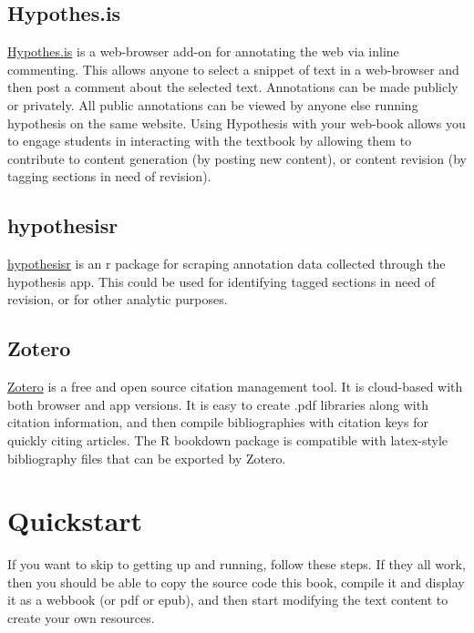 \documentclass[]{book}
\theoremstyle{definition}
\theoremstyle{definition}
\theoremstyle{definition}
\theoremstyle{remark}
\begin{document}
\subsection{Hypothes.is}\label{hypothes.is}

\href{https://web.hypothes.is}{Hypothes.is} is a web-browser add-on for
annotating the web via inline commenting. This allows anyone to select a
snippet of text in a web-browser and then post a comment about the
selected text. Annotations can be made publicly or privately. All public
annotations can be viewed by anyone else running hypothesis on the same
website. Using Hypothesis with your web-book allows you to engage
students in interacting with the textbook by allowing them to contribute
to content generation (by posting new content), or content revision (by
tagging sections in need of revision).

\subsection{hypothesisr}\label{hypothesisr}

\href{https://github.com/mdlincoln/hypothesisr}{hypothesisr} is an r
package for scraping annotation data collected through the hypothesis
app. This could be used for identifying tagged sections in need of
revision, or for other analytic purposes.

\subsection{Zotero}\label{zotero}

\href{https://www.zotero.org}{Zotero} is a free and open source citation
management tool. It is cloud-based with both browser and app versions.
It is easy to create .pdf libraries along with citation information, and
then compile bibliographies with citation keys for quickly citing
articles. The R bookdown package is compatible with latex-style
bibliography files that can be exported by Zotero.

\section{Quickstart}\label{quickstart}

If you want to skip to getting up and running, follow these steps. If
they all work, then you should be able to copy the source code this
book, compile it and display it as a webbook (or pdf or epub), and then
start modifying the text content to create your own resources.
\end{document}

